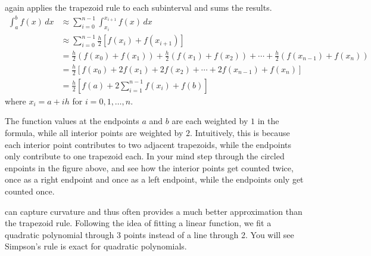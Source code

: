  again applies the trapezoid rule to each subinterval and sums the results.
\begin{align*}
    \int_a^b f(x)\, dx &\approx \sum_{i=0}^{n-1} \int_{x_i}^{x_{i+1}} f(x)\, dx \\
    &\approx \sum_{i=0}^{n-1} \frac{h}{2} \left[ f(x_i) + f(x_{i+1}) \right] \\
    &= \frac{h}{2} \left( f(x_0) + f(x_1) \right) + \frac{h}{2} \left( f(x_1) + f(x_2) \right) + \cdots + \frac{h}{2} \left( f(x_{n-1}) + f(x_n) \right) \\
    &= \frac{h}{2} \left[ f(x_0) + 2f(x_1) + 2f(x_2) + \cdots + 2f(x_{n-1}) + f(x_n) \right] \\
    &= \frac{h}{2} \left[ f(a) + 2\sum_{i=1}^{n-1} f(x_i) + f(b) \right]
\end{align*}
where $x_i = a + i h$ for $i = 0, 1, \ldots, n$.


The function values at the endpoints $a$ and $b$ are each weighted by $1$ in the formula, while all interior points are weighted by $2$. 
Intuitively, this is because each interior point contributes to two adjacent trapezoids, while the endpoints only contribute to one trapezoid each.
In your mind step through the circled enpoints in the figure above, and see how the interior points get counted twice, once as a right endpoint and once as a left endpoint, while the endpoints only get counted once.





 can capture curvature and thus often provides a much better approximation than the trapezoid rule.
Following the idea of fitting a linear function, we fit a quadratic polynomial through 3 points instead of a line through 2. 
You will see Simpson's rule is exact for quadratic polynomials.



